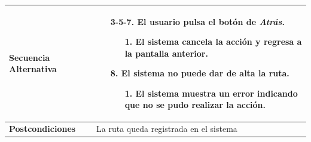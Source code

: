 \begin{longtable}{| p{4cm} | p{10cm} |}
\hline
\textbf{Secuencia Alternativa} &\mbox{}\par\vspace{-\baselineskip}
\begin{enumerate}[leftmargin=0.9cm, topsep=0.1cm]
\item[3-5-7.] El usuario pulsa el botón de \textit{Atrás}.
	\begin{itemize}
	\item[1.] El sistema cancela la acción y regresa a la pantalla anterior.
	\end{itemize}
\item[8.] El sistema no puede dar de alta la ruta.
	\begin{itemize}
	\item[1.] El sistema muestra un error indicando que no se pudo realizar la acción.
	\end{itemize}
\end{enumerate}


\\

\hline
\textbf{Postcondiciones} & 
La ruta queda registrada en el sistema\\
\hline
\end{longtable}




\newpage
